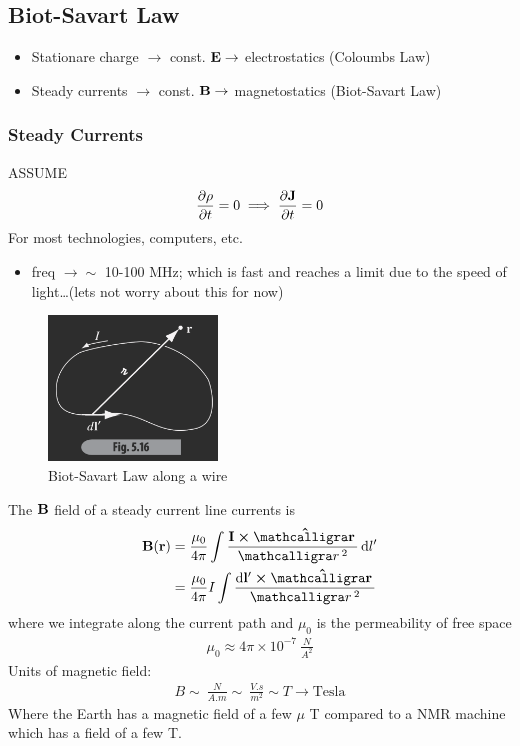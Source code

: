 \documentclass[../main.tex]{subfiles}
\begin{document}
\subsection{Biot-Savart Law}
\begin{itemize}
    \item Stationare charge $\to$ const. $\vb E \to$ electrostatics (Coloumbs Law)
    \item Steady currents $\to$ const. $\vb B \to$ magnetostatics (Biot-Savart Law)
\end{itemize}

\subsubsection{Steady Currents}
ASSUME
\begin{align*}
    \pdv{\rho}{t} = 0 \implies \pdv{\vb J}{t} = 0
\end{align*}
For most technologies, computers, etc.
\begin{itemize}
    \item freq $\to \sim$ 10-100 MHz; which is fast and reaches a limit due to the speed of light\dots (lets not worry about this for now)
\end{itemize}
\begin{figure}[ht]
    \centering
    \includegraphics[width=0.4\textwidth]{fig5_16.png}
    \caption{Biot-Savart Law along a wire}
    \label{fig:fig5_16}
\end{figure}

The $\vb B$ field of a steady current line currents is
\begin{align*}
    \vb B(\vb r) &= \frac{\mu_0}{4\pi} \int \frac{\vb I \cross \vu{\scriptr}}{\scriptr^2} \dd{l'} \\
    &= \frac{\mu_0}{4\pi} I \int \frac{\dd{\vb l'} \cross \vu{\scriptr}}{\scriptr^2}
\end{align*}
where we integrate along the current path and $\mu_0$ is the permeability of free space
\begin{align*}
    \mu_0 \approx 4\pi \times 10^{-7} \qty{}{\frac{N}{A^2}}
\end{align*}
Units of magnetic field:
\begin{align*}
    B \sim \qty{}{\frac{N}{A.m}} \sim \qty{}{\frac{V.s}{m^2}} \sim T \to \text{Tesla}
\end{align*}
Where the Earth has a magnetic field of a few $\mu$ T compared to a NMR machine which has a field of a few T.
\end{document}

